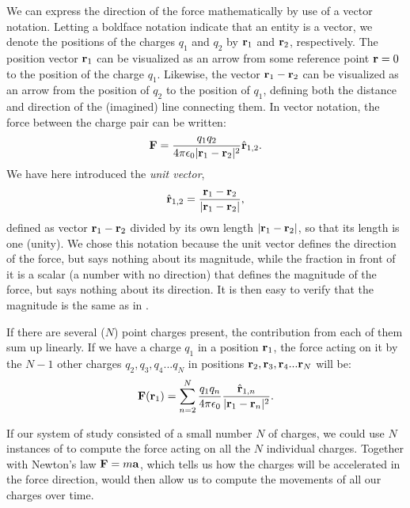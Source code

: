 We can express the direction of the force mathematically by use of a vector notation. Letting a boldface notation indicate that an entity is a vector, we denote the positions of the charges $q_1$ and $q_2$ by ${\bf r}_1$ and ${\bf r}_2$, respectively. The position vector ${\bf r}_1$ can be visualized as an arrow from some reference point ${\bf r} =0$ to the position of the charge $q_1$. Likewise, the vector ${\bf r}_1-{\bf r}_2$ can be visualized as an arrow from the position of $q_2$ to the position of $q_1$, defining both the distance and direction of the (imagined) line connecting them. In vector notation, the force between the charge pair can be written:
\begin{equation}
{\bf F} = \frac{q_1q_2}{4\pi \epsilon_0 |{\bf r}_1-{\bf r}_2|^2} \hat{{\bf r}}_{1,2}.
\label{eq:Basics:CoulombFvec}
\end{equation}
We have here introduced the \textit{unit vector},
\begin{equation}
\hat{{\bf r}}_{1,2} = \frac{{\bf r}_1 - {\bf r}_2}{|{\bf r}_1-{\bf r}_2|},
\label{eq:Basics:UnitVector}
\end{equation}
defined as vector ${\bf r}_1-{\bf r}_2$ divided by its own length $|{\bf r}_1-{\bf r}_2|$, so that its length is one (unity). We chose this notation because the unit vector defines the direction of the force, but says nothing about its magnitude, while the fraction in front of it is a scalar (a number with no direction) that defines the magnitude of the force, but  says nothing about its direction. It is then easy to verify that the magnitude is the same as in .

If there are several ($N$) point charges present, the contribution from each of them sum up linearly. If we have a charge $q_1$ in a position ${\bf r}_1$, the force acting on it by the $N-1$ other charges $q_2, q_3, q_4 ... q_{N}$ in positions ${\bf r}_2, {\bf r}_3, {\bf r}_4 ... {\bf r}_{N}$ will be:
\begin{equation}
{\bf F}({\bf r}_1) = \sum_{n=2}^{N} \frac{q_1 q_n}{4\pi \epsilon_0} \frac{\hat{{\bf r}}_{1,n}}{|{\bf r}_1-{\bf r}_n|^2}.
\label{eq:Basics:CoulombFN}
\end{equation}

If our system of study consisted of a small number $N$ of charges, we could use $N$ instances of  to compute the force acting on all the $N$ individual charges. Together with Newton's law ${\bf F} = m {\bf a}$, which tells us how the charges will be accelerated in the force direction,  would then allow us to compute the movements of all our charges over time.

